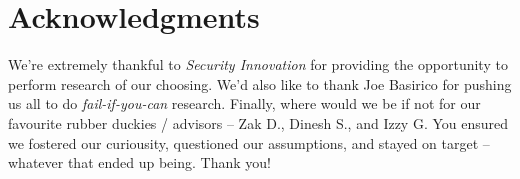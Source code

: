 \section{Acknowledgments}
We're extremely thankful to \textit{Security Innovation} for providing the opportunity to perform research of our choosing. 
We'd also like to thank Joe Basirico for pushing us all to do \textit{fail-if-you-can} research.
\noindent
Finally, where would we be if not for our favourite rubber duckies / advisors -- Zak D., Dinesh S., and Izzy G. You ensured 
we fostered our curiousity, questioned our assumptions, and stayed on target -- whatever that ended up being. Thank you!
